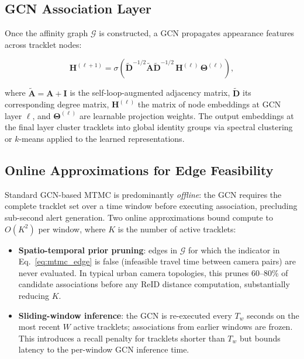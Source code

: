 \documentclass[11pt,a4paper]{article}
\begin{document}
\subsection{GCN Association Layer}

Once the affinity graph $\mathcal{G}$ is constructed, a GCN
propagates appearance features across tracklet nodes:

\begin{equation}
  \mathbf{H}^{(\ell+1)} = \sigma\!\left(
    \tilde{\mathbf{D}}^{-1/2}\tilde{\mathbf{A}}
    \tilde{\mathbf{D}}^{-1/2}\,\mathbf{H}^{(\ell)}\,
    \mathbf{\Theta}^{(\ell)}
  \right),
  \label{eq:gcn}
\end{equation}

\noindent where $\tilde{\mathbf{A}} = \mathbf{A} + \mathbf{I}$ is
the self-loop-augmented adjacency matrix, $\tilde{\mathbf{D}}$ its
corresponding degree matrix, $\mathbf{H}^{(\ell)}$ the matrix of
node embeddings at GCN layer $\ell$, and $\mathbf{\Theta}^{(\ell)}$
are learnable projection weights. The output embeddings at the final
layer cluster tracklets into global identity groups via spectral
clustering or $k$-means applied to the learned representations.

\subsection{Online Approximations for Edge Feasibility}

Standard GCN-based MTMC is predominantly \emph{offline}: the GCN
requires the complete tracklet set over a time window before
executing association, precluding sub-second alert generation.
Two online approximations bound compute to $O(K^2)$ per window,
where $K$ is the number of active tracklets:

\begin{itemize}[leftmargin=*, noitemsep]
  \item \textbf{Spatio-temporal prior pruning}: edges in
    $\mathcal{G}$ for which the indicator in
    Eq.~\ref{eq:mtmc_edge} is false (infeasible travel time between
    camera pairs) are never evaluated. In typical urban camera
    topologies, this prunes 60--80\% of candidate associations
    before any ReID distance computation, substantially reducing $K$.
  \item \textbf{Sliding-window inference}: the GCN is re-executed
    every $T_w$ seconds on the most recent $W$ active tracklets;
    associations from earlier windows are frozen. This introduces
    a recall penalty for tracklets shorter than $T_w$ but bounds
    latency to the per-window GCN inference time.
\end{itemize}
\end{document}
